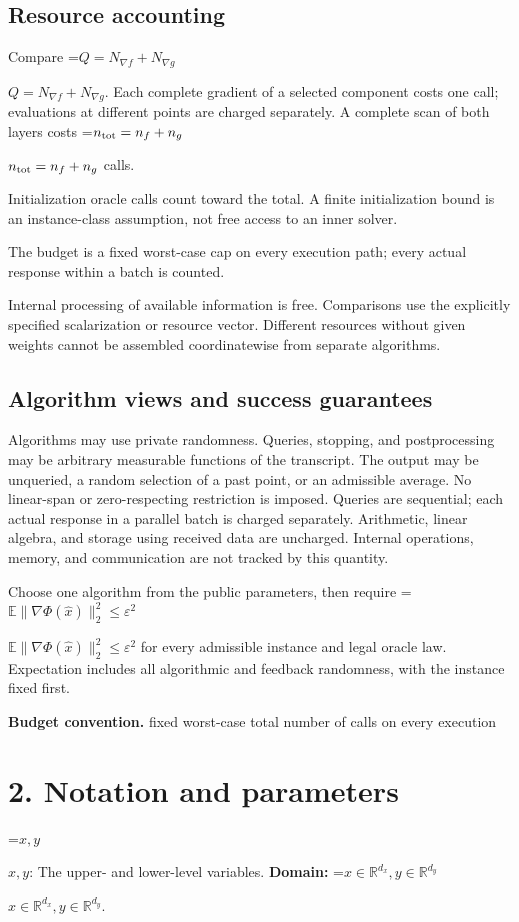 \documentclass[10pt,a4paper]{article}
\newcommand{\AtlasMath}[1]{\par\begingroup\centering\setbox0=\hbox{$\displaystyle #1$}\ifdim\wd0>1.4\linewidth\typeout{ATLAS WIDE FORMULA: \the\wd0}\fi\ifdim\wd0>\linewidth\resizebox{\linewidth}{!}{\box0}\else\box0\fi\par\endgroup}
\newcommand{\AtlasInlineMath}[1]{\begingroup\setbox0=\hbox{$#1$}\ifdim\wd0>.4\linewidth\endgroup\AtlasMath{#1}\else\endgroup$#1$\fi}
\begin{document}
\subsection{Resource accounting}
Compare \AtlasInlineMath{Q=N_{\nabla f}+N_{\nabla g}}. Each complete gradient of a selected component costs one call; evaluations at different points are charged separately. A complete scan of both layers costs \AtlasInlineMath{n_{\rm tot}=n_f+n_g} calls.

Initialization oracle calls count toward the total. A finite initialization bound is an instance-class assumption, not free access to an inner solver.

The budget is a fixed worst-case cap on every execution path; every actual response within a batch is counted.

Internal processing of available information is free. Comparisons use the explicitly specified scalarization or resource vector. Different resources without given weights cannot be assembled coordinatewise from separate algorithms.

\subsection{Algorithm views and success guarantees}
Algorithms may use private randomness. Queries, stopping, and postprocessing may be arbitrary measurable functions of the transcript. The output may be unqueried, a random selection of a past point, or an admissible average. No linear-span or zero-respecting restriction is imposed. Queries are sequential; each actual response in a parallel batch is charged separately. Arithmetic, linear algebra, and storage using received data are uncharged. Internal operations, memory, and communication are not tracked by this quantity.

Choose one algorithm from the public parameters, then require \AtlasInlineMath{\mathbb{E}\|\nabla\Phi(\widehat{x})\|_2^2\le\varepsilon^2} for every admissible instance and legal oracle law. Expectation includes all algorithmic and feedback randomness, with the instance fixed first.

\textbf{Budget convention.} fixed worst-case total number of calls on every execution

\section{2. Notation and parameters}
\AtlasInlineMath{x,y}: The upper- and lower-level variables. \textbf{Domain:} \AtlasInlineMath{x\in\mathbb R^{d_x},y\in\mathbb R^{d_y}}.
\end{document}
